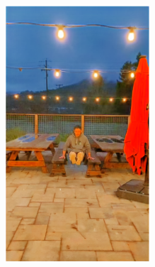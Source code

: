\documentclass[letterpaper,12pt]{article}
\begin{document}
\begin{figure}[htbp]
\begin{subfigure}{0.128\textwidth}
			\includegraphics[width=\linewidth]{LoLi-Phone-imgT_1/DRBN}
			\captionsetup{font=scriptsize}
			\caption{}
			\label{fig: LoLi-Phone-imgT_1_k}  
		\end{subfigure}    
		\begin{subfigure}{0.128\textwidth}

\end{subfigure}
\end{figure}
\end{document}
